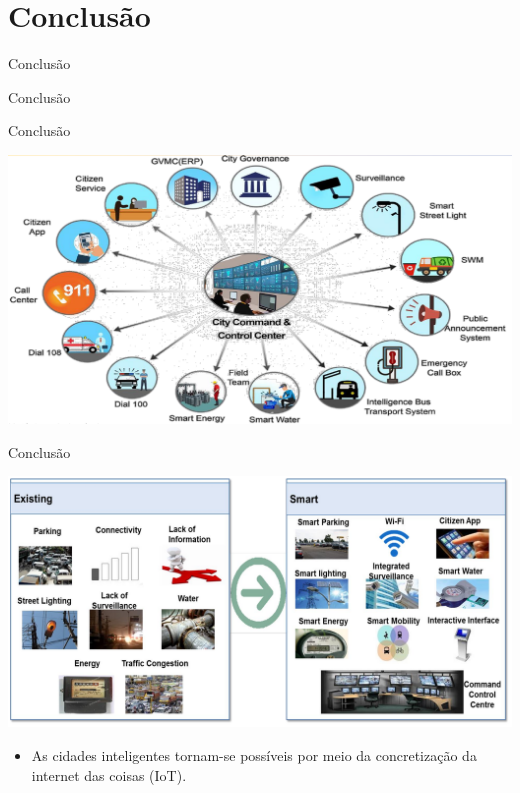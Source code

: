 \documentclass{beamer}
\begin{document}
\section{Conclusão}

\begin{frame}{Conclusão}
\begin{center}
Conclusão
\end{center}
\end{frame}



\begin{frame}{Conclusão}
\begin{center}
\includegraphics[width=1\textwidth]{img/conclusion.png}
\end{center}
\end{frame}


\begin{frame}{Conclusão}
\begin{center}
\includegraphics[width=.8\textwidth]{img/conclusion_2.png}
\end{center}
\begin{itemize}
\item As cidades inteligentes tornam-se possíveis por meio da
concretização da internet das coisas (IoT). 
\end{itemize}
\end{frame}
\end{document}
